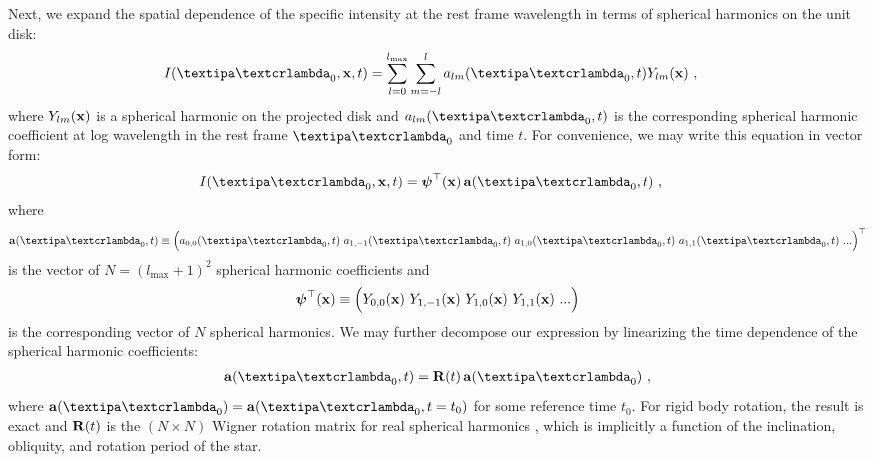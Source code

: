 \documentclass[modern]{aastex631}
\begin{document}
Next, we expand the spatial dependence of the specific intensity at the rest frame wavelength in terms of spherical harmonics on the unit disk:
%
\begin{align}
    \label{eq:deconv:Ixi0}
    I(\lnlam_0, \x, t)
     & =
    \sum_{l=0}^{l_\mathrm{max}}\sum_{m=-l}^{l} a_{lm}(\lnlam_0, t) Y_{lm}(\x)
    \quad ,
\end{align}
%
where $Y_{lm}({\mathbf{x}})$ is a spherical harmonic on the projected disk and $a_{lm}(\lnlam_0, t)$ is the corresponding spherical harmonic coefficient at log wavelength in the rest frame $\lnlam_0$ and time $t$. 
For convenience, we may write this equation in vector form:
%
\begin{align}
    \label{eq:deconv:Ivec}
    I(\lnlam_0, \x, t) & =
    \ylmbasis(\x) \,
    \almt(\lnlam_0, t)
    \quad ,
\end{align}
%
where
%
\begin{align}
    \label{eq:deconv:almt}
    \almt(\lnlam_0, t) \equiv
    \Big(
    a_{0,0}(\lnlam_0, t) \quad 
    a_{1,-1}(\lnlam_0, t) \quad 
    a_{1,0}(\lnlam_0, t) \quad 
    a_{1,1}(\lnlam_0, t) \quad
    ...
    \Big)^\top
\end{align}
%
is the vector of $N = (l_\mathrm{max} + 1)^2$ spherical harmonic coefficients and
%
\begin{align}
    \label{eq:deconv:ylmbasis}
    \boldsymbol{\psi}^\top({\mathbf{x}}) \equiv
    \Big(
    Y_{0,0}({\mathbf{x}}) \hskip 0.33em 
    Y_{1,-1}({\mathbf{x}}) \hskip 0.33em 
    Y_{1,0}({\mathbf{x}}) \hskip 0.33em 
    Y_{1,1}({\mathbf{x}}) \hskip 0.33em
    ...
    \Big)
\end{align}
%
is the corresponding vector of $N$ spherical harmonics. 
We may further decompose our expression by linearizing the time dependence of the spherical harmonic coefficients:
%
\begin{align}
    \label{eq:deconv:R}
    \almt(\lnlam_0, t) = \R(t) \, \alm(\lnlam_0)
    \quad ,
\end{align}
%
where $\alm(\lnlam_0) = \bvec{a}(\lnlam_0, t=t_0)$ for some reference time $t_0$.
For rigid body rotation, the result is exact and ${\mathbf{R}}(t)$ is the $(N \times N)$ Wigner rotation matrix for real spherical harmonics
\citep[e.g.][]{AlvarezCollado1989}, which is implicitly a function of the inclination, obliquity, and rotation period of the star.
\end{document}
